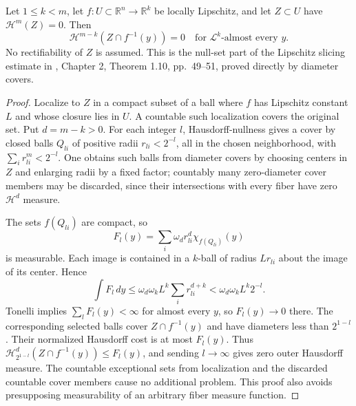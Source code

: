 \begin{lemma}\label{lem:null-set-lipschitz-fibers}
Let $1\leq k<m$, let $f:U\subset\mathbb R^n\to\mathbb R^k$ be locally Lipschitz, and let $Z\subset U$ have $\mathcal H^m(Z)=0$. Then
\[
 \mathcal H^{m-k}(Z\cap f^{-1}(y))=0
 \quad\text{for }\mathcal L^k\text{-almost every }y.
\]
No rectifiability of $Z$ is assumed. This is the null-set part of the Lipschitz slicing estimate in \cite{Sim18}, Chapter 2, Theorem 1.10, pp.~49--51, proved directly by diameter covers.
\end{lemma}
\begin{proof}
Localize to $Z$ in a compact subset of a ball where $f$ has Lipschitz constant $L$ and whose closure lies in $U$. A countable such localization covers the original set. Put $d=m-k>0$. For each integer $l$, Hausdorff-nullness gives a cover by closed balls $Q_{li}$ of positive radii $r_{li}<2^{-l}$, all in the chosen neighborhood, with $\sum_i r_{li}^m<2^{-l}$. One obtains such balls from diameter covers by choosing centers in $Z$ and enlarging radii by a fixed factor; countably many zero-diameter cover members may be discarded, since their intersections with every fiber have zero $\mathcal H^d$ measure.

The sets $f(Q_{li})$ are compact, so
\[
 F_l(y)=\sum_i\omega_d r_{li}^d\chi_{f(Q_{li})}(y)
\]
is measurable. Each image is contained in a $k$-ball of radius $Lr_{li}$ about the image of its center. Hence
\[
 \int F_l\,dy\leq\omega_d\omega_kL^k\sum_i r_{li}^{d+k}
 <\omega_d\omega_kL^k2^{-l}.
\]
Tonelli implies $\sum_lF_l(y)<\infty$ for almost every $y$, so $F_l(y)\to0$ there. The corresponding selected balls cover $Z\cap f^{-1}(y)$ and have diameters less than $2^{1-l}$. Their normalized Hausdorff cost is at most $F_l(y)$. Thus $\mathcal H^d_{2^{1-l}}(Z\cap f^{-1}(y))\leq F_l(y)$, and sending $l\to\infty$ gives zero outer Hausdorff measure. The countable exceptional sets from localization and the discarded countable cover members cause no additional problem. This proof also avoids presupposing measurability of an arbitrary fiber measure function.
\end{proof}

